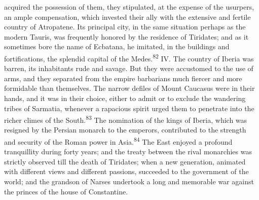 acquired the possession of them, they stipulated, at the expense
of the usurpers, an ample compensation, which invested their ally
with the extensive and fertile country of Atropatene. Its
principal city, in the same situation perhaps as the modern
Tauris, was frequently honored by the residence of Tiridates; and
as it sometimes bore the name of Ecbatana, he imitated, in the
buildings and fortifications, the splendid capital of the Medes.\textsuperscript{82}
IV. The country of Iberia was barren, its inhabitants rude and
savage. But they were accustomed to the use of arms, and they
separated from the empire barbarians much fiercer and more
formidable than themselves. The narrow defiles of Mount Caucasus
were in their hands, and it was in their choice, either to admit
or to exclude the wandering tribes of Sarmatia, whenever a
rapacious spirit urged them to penetrate into the richer climes
of the South.\textsuperscript{83} The nomination of the kings of Iberia, which was
resigned by the Persian monarch to the emperors, contributed to
the strength and security of the Roman power in Asia.\textsuperscript{84} The East
enjoyed a profound tranquillity during forty years; and the
treaty between the rival monarchies was strictly observed till
the death of Tiridates; when a new generation, animated with
different views and different passions, succeeded to the
government of the world; and the grandson of Narses undertook a
long and memorable war against the princes of the house of
Constantine.


